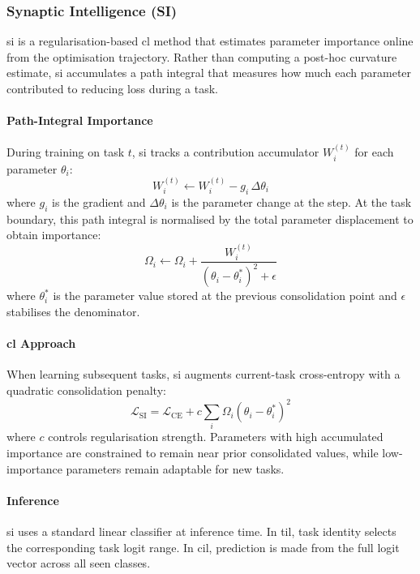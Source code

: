 \subsubsection{Synaptic Intelligence (SI)}

\gls{si} is a regularisation-based \gls{cl} method that estimates parameter
importance online from the optimisation trajectory. Rather than computing a
post-hoc curvature estimate, \gls{si} accumulates a path integral that measures
how much each parameter contributed to reducing loss during a task.

\paragraph{Path-Integral Importance}

During training on task $t$, \gls{si} tracks a contribution accumulator
$W_i^{(t)}$ for each parameter $\theta_i$:
%
\begin{equation}\label{eqn:si_path}
    W_i^{(t)}
    \leftarrow
    W_i^{(t)} - g_i \,\Delta\theta_i
\end{equation}
%
where $g_i$ is the gradient and $\Delta\theta_i$ is the parameter change at the
step. At the task boundary, this path integral is normalised by the total
parameter displacement to obtain importance:
%
\begin{equation}\label{eqn:si_omega}
    \Omega_i
    \leftarrow
    \Omega_i
    +
    \frac{W_i^{(t)}}{(\theta_i-\theta_i^*)^2+\epsilon}
\end{equation}
%
where $\theta_i^*$ is the parameter value stored at the previous
consolidation point and $\epsilon$ stabilises the denominator.

\paragraph{\gls{cl} Approach}

When learning subsequent tasks, \gls{si} augments current-task cross-entropy
with a quadratic consolidation penalty:
%
\begin{equation}\label{eqn:si_loss}
    \mathcal{L}_\text{SI}
    =
    \mathcal{L}_\text{CE}
    +
    c
    \sum_i \Omega_i(\theta_i-\theta_i^*)^2
\end{equation}
%
where $c$ controls regularisation strength. Parameters with high accumulated
importance are constrained to remain near prior consolidated values, while
low-importance parameters remain adaptable for new tasks.

\paragraph{Inference}

\gls{si} uses a standard linear classifier at inference time. In \gls{til}, task
identity selects the corresponding task logit range. In \gls{cil}, prediction
is made from the full logit vector across all seen classes.

